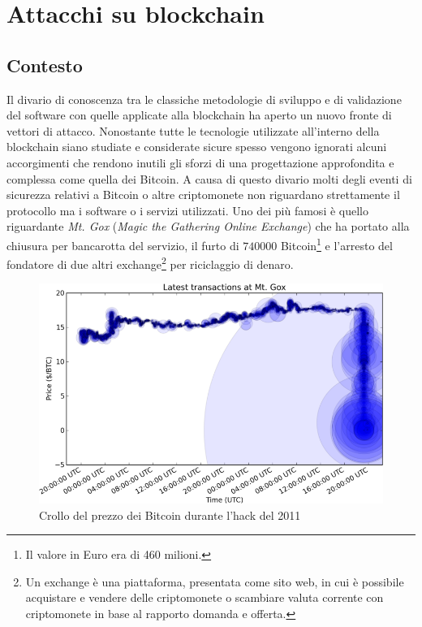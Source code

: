 \chapter{Attacchi su blockchain}

\section{Contesto}
Il divario di conoscenza tra le classiche metodologie di sviluppo e di validazione del software con quelle applicate alla blockchain ha aperto un nuovo fronte di vettori di attacco. Nonostante tutte le tecnologie utilizzate all'interno della blockchain siano studiate e considerate sicure spesso vengono ignorati alcuni accorgimenti che rendono inutili gli sforzi di una progettazione approfondita e complessa come quella dei Bitcoin.\newline
A causa di questo divario molti degli eventi di sicurezza relativi a Bitcoin o altre criptomonete non riguardano strettamente il protocollo ma i software o i servizi utilizzati. Uno dei più famosi è quello riguardante \textit{Mt. Gox} (\textit{Magic the Gathering Online Exchange}) che ha portato alla chiusura per bancarotta del servizio, il furto di $740000$ Bitcoin\footnote{Il valore in Euro era di 460 milioni.} e l'arresto del fondatore di due altri exchange\footnote{Un exchange è una piattaforma, presentata come sito web, in cui è possibile acquistare e vendere delle criptomonete o scambiare valuta corrente con criptomonete in base al rapporto domanda e offerta.} per riciclaggio di denaro.\newline
\begin{figure}
    \centering
    \includegraphics[width=\textwidth]{images/mtgox_cent.png}
    \caption{Crollo del prezzo dei Bitcoin durante l'hack del 2011}
\end{figure}
